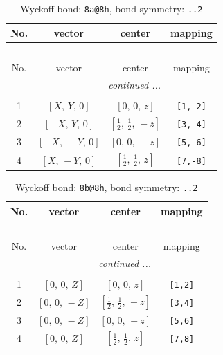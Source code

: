 \documentclass[fleqn,8pt]{jsarticle}
\begin{document}
\begin{longtable}{cccc}
\caption{Wyckoff bond: {\tt 8a@8h}, bond symmetry: {\tt ..2}}
 \\
 \hline \hline
No. & vector & center & mapping \\ \hline \endfirsthead

\multicolumn{3}{l}{\tablename\ \thetable{}} \\
 \hline \hline
No. & vector & center & mapping \\ \hline \endhead

 \hline \hline
\multicolumn{3}{r}{\footnotesize\it continued ...} \\ \endfoot

 \hline \hline
\multicolumn{3}{r}{} \\ \endlastfoot

1 & $\left[ X,\, Y,\, 0 \right]$ & $\left[ 0,\, 0,\, z \right]$ & {\tt [1,-2]} \\ \hline
2 & $\left[ - X,\, Y,\, 0 \right]$ & $\left[ \frac{1}{2},\, \frac{1}{2},\, - z \right]$ & {\tt [3,-4]} \\ \hline
3 & $\left[ - X,\, - Y,\, 0 \right]$ & $\left[ 0,\, 0,\, - z \right]$ & {\tt [5,-6]} \\ \hline
4 & $\left[ X,\, - Y,\, 0 \right]$ & $\left[ \frac{1}{2},\, \frac{1}{2},\, z \right]$ & {\tt [7,-8]} \\
\end{longtable}
\renewcommand{\arraystretch}{1.2}
\begin{longtable}{cccc}
\caption{Wyckoff bond: {\tt 8b@8h}, bond symmetry: {\tt ..2}}
 \\
 \hline \hline
No. & vector & center & mapping \\ \hline \endfirsthead

\multicolumn{3}{l}{\tablename\ \thetable{}} \\
 \hline \hline
No. & vector & center & mapping \\ \hline \endhead

 \hline \hline
\multicolumn{3}{r}{\footnotesize\it continued ...} \\ \endfoot

 \hline \hline
\multicolumn{3}{r}{} \\ \endlastfoot

1 & $\left[ 0,\, 0,\, Z \right]$ & $\left[ 0,\, 0,\, z \right]$ & {\tt [1,2]} \\ \hline
2 & $\left[ 0,\, 0,\, - Z \right]$ & $\left[ \frac{1}{2},\, \frac{1}{2},\, - z \right]$ & {\tt [3,4]} \\ \hline
3 & $\left[ 0,\, 0,\, - Z \right]$ & $\left[ 0,\, 0,\, - z \right]$ & {\tt [5,6]} \\ \hline
4 & $\left[ 0,\, 0,\, Z \right]$ & $\left[ \frac{1}{2},\, \frac{1}{2},\, z \right]$ & {\tt [7,8]} \\
\end{longtable}
\end{document}
